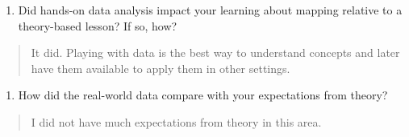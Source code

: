 \documentclass[]{article}
\providecommand{\tightlist}{%
  \setlength{\itemsep}{0pt}\setlength{\parskip}{0pt}}
\begin{document}
\begin{enumerate}
\def\labelenumi{\arabic{enumi}.}
\setcounter{enumi}{14}
\tightlist
\item
  Did hands-on data analysis impact your learning about mapping relative
  to a theory-based lesson? If so, how?
\end{enumerate}

\begin{quote}
It did. Playing with data is the best way to understand concepts and
later have them available to apply them in other settings.
\end{quote}

\begin{enumerate}
\def\labelenumi{\arabic{enumi}.}
\setcounter{enumi}{15}
\tightlist
\item
  How did the real-world data compare with your expectations from
  theory?
\end{enumerate}

\begin{quote}
I did not have much expectations from theory in this area.
\end{quote}
\end{document}
